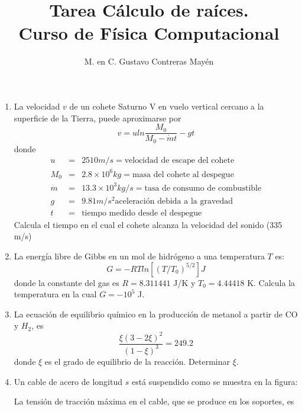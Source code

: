 \documentclass[11pt]{article}
\title{Tarea C\'{a}lculo de ra\'{i}ces. \\ Curso de F\'{i}sica Computacional}
\author{M. en C. Gustavo Contreras May\'{e}n}
\date{ }
\begin{document}
\maketitle
\fontsize{14}{14}\selectfont
\begin{enumerate}
\item La velocidad $v$ de un cohete Saturno V en vuelo vertical cercano a la superficie de la Tierra, puede aproximarse por
\[ v = u ln \dfrac{M_{0}}{M_{0} - \dot{m}t} - gt\]
donde
\begin{eqnarray*}
u &=& 2510 m/s = \text{velocidad de escape del cohete} \\
M_{0} &=& 2.8 \times 10^{6} kg = \text{masa del cohete al despegue} \\
\dot{m} &=& 13.3 \times 10^{3} kg/s = \text{tasa de consumo de combustible} \\ 
g &=& 9.81 m/s^{2} \text{aceleraci\'{o}n debida a la gravedad} \\
t &=& \text{tiempo medido desde el despegue}
\end{eqnarray*}
Calcula el tiempo en el cual el cohete alcanza la velocidad del sonido (335 m/s)
\item La energ\'{i}a libre de Gibbs en un mol de hidr\'{o}geno a una temperatura $T$ es:
\[ G = -RT ln [(T/T_{0})^{5/2}] J \]
donde la constante del gas es $R=8.311441$ J/K y $T_{0}=4.44418$ K. Calcula la temperatura en la cual $G=-10^{5}$ J.
\item La ecuaci\'{o}n de equilibrio qu\'{i}mico en la producci\'{o}n de metanol a partir de CO y $H_{2}$, es
\[ \dfrac{\xi (3-2 \xi)^{2}}{(1-\xi)^{3}} = 249.2\]
donde $\xi$ es el grado de equilibrio de la reacción. Determinar $\xi$.
\item Un cable de acero de longitud $s$ est\'{a} suspendido como se muestra en la figura:
\begin{center}
\end{center}
La tensi\'{o}n de tracci\'{o}n m\'{a}xima en el cable, que se produce en los soportes, es

\end{enumerate}
\end{document}

